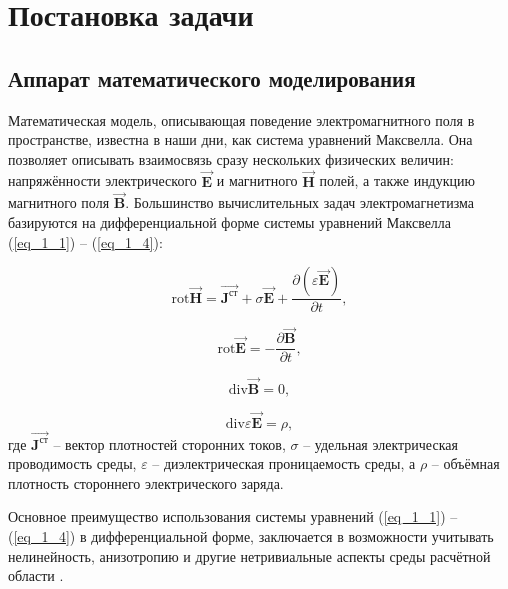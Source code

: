 \chapter{Постановка задачи}

\section{Аппарат математического моделирования}

Математическая модель, описывающая поведение электромагнитного поля в пространстве, известна в наши дни, как система уравнений Максвелла. Она позволяет описывать взаимосвязь сразу нескольких физических величин: напряжённости электрического $\overrightarrow{\textbf{E}}$ и магнитного $\overrightarrow{\textbf{H}}$ полей, а также индукцию магнитного поля $\overrightarrow{\textbf{B}}$. Большинство вычислительных задач электромагнетизма базируются на дифференциальной форме системы уравнений Максвелла (\ref{eq_1_1}) -- (\ref{eq_1_4}):

\begin{equation} \label{eq_1_1}
	\text{rot} \overrightarrow{\textbf{H}} = \overrightarrow{\textbf{J}^{\text{ст}}} + \sigma \overrightarrow{\textbf{E}} + \frac{\partial \left(\varepsilon \overrightarrow{\textbf{E}} \right)}{\partial t},
\end{equation}

\begin{equation} \label{eq_1_2}
	\text{rot} \overrightarrow{\textbf{E}} = - \frac{\partial \overrightarrow{\textbf{B}}}{\partial t},
\end{equation}

\begin{equation} \label{eq_1_3}
	\text{div} \overrightarrow{\textbf{B}} = 0,
\end{equation}

\begin{equation} \label{eq_1_4}
	\text{div} \varepsilon \overrightarrow{\textbf{E}} = \rho,
\end{equation}
где $\overrightarrow{\textbf{J}^{\text{ст}}}$ -- вектор плотностей сторонних токов, $\sigma$ -- удельная электрическая проводимость среды, $\varepsilon$ -- диэлектрическая проницаемость среды, а $\rho$ -- объёмная плотность стороннего электрического заряда.

Основное преимущество использования системы уравнений (\ref{eq_1_1}) -- (\ref{eq_1_4}) в дифференциальной форме, заключается в возможности учитывать нелинейность, анизотропию и другие нетривиальные аспекты среды расчётной области \cite{2}. 

